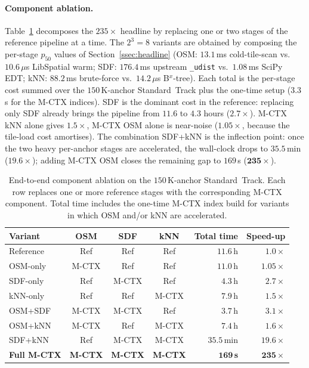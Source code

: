 \paragraph*{Component ablation.}
Table~\ref{tab:e2e_ablation} decomposes the $235\times$ headline by
replacing one or two stages of the reference pipeline at a time.  The
$2^3{=}8$ variants are obtained by composing the per-stage
$p_{50}$ values of Section~\ref{ssec:headline}
(OSM: $13.1$\,ms cold-tile-scan vs.\ $10.6$\,$\mu$s LibSpatial warm;
SDF: $176.4$\,ms upstream \texttt{\_udist} vs.\ $1.08$\,ms SciPy EDT;
kNN: $88.2$\,ms brute-force vs.\ $14.2$\,$\mu$s B$^{x}$-tree).
Each total is the per-stage cost summed over the $150$\,K-anchor
Standard~Track plus the one-time setup ($3.3$\,s for the M-CTX
indices).  SDF is the dominant cost in the reference: replacing only
SDF already brings the pipeline from $11.6$ to $4.3$ hours
($2.7\times$).  M-CTX kNN alone gives $1.5\times$, M-CTX OSM alone is
near-noise ($1.05\times$, because the tile-load cost amortises).
The combination SDF+kNN is the inflection point: once the two
heavy per-anchor stages are accelerated, the wall-clock drops to
$35.5$\,min ($\mathbf{19.6\times}$); adding M-CTX OSM closes the
remaining gap to $169$\,s ($\mathbf{235\times}$).

\begin{table}[t]
\centering
\caption{End-to-end component ablation on the $150$\,K-anchor
Standard~Track.  Each row replaces one or more reference stages with
the corresponding M-CTX component.  Total time includes the one-time
M-CTX index build for variants in which OSM and/or kNN are
accelerated.}\label{tab:e2e_ablation}
\small
\setlength{\tabcolsep}{3pt}
\begin{tabular}{lcccrr}
\toprule
Variant & OSM & SDF & kNN & Total time & Speed-up \\
\midrule
Reference  & Ref   & Ref   & Ref   & $11.6$\,h            & $1.0\times$ \\
OSM-only   & M-CTX & Ref   & Ref   & $11.0$\,h            & $1.05\times$ \\
SDF-only   & Ref   & M-CTX & Ref   & $4.3$\,h             & $2.7\times$ \\
kNN-only   & Ref   & Ref   & M-CTX & $7.9$\,h             & $1.5\times$ \\
OSM+SDF    & M-CTX & M-CTX & Ref   & $3.7$\,h             & $3.1\times$ \\
OSM+kNN    & M-CTX & Ref   & M-CTX & $7.4$\,h             & $1.6\times$ \\
SDF+kNN    & Ref   & M-CTX & M-CTX & $35.5$\,min          & $19.6\times$ \\
\textbf{Full M-CTX} & \textbf{M-CTX} & \textbf{M-CTX} & \textbf{M-CTX}
                                                          & $\mathbf{169}$\,\textbf{s}
                                                          & $\mathbf{235\times}$ \\
\bottomrule
\end{tabular}
\setlength{\tabcolsep}{6pt}
\end{table}


